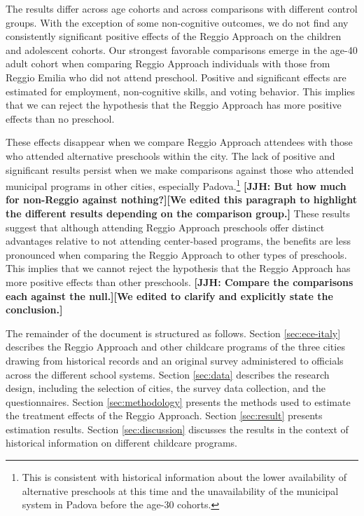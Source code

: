 The results differ across age cohorts and across comparisons with different control groups. With the exception of some non-cognitive outcomes, we do not find any consistently significant positive effects of the Reggio Approach on the children and adolescent cohorts. Our strongest favorable comparisons emerge in the age-40 adult cohort when comparing Reggio Approach individuals with those from Reggio Emilia who did not attend preschool. Positive and significant effects are estimated for employment, non-cognitive skills, and voting behavior. This implies that we can reject the hypothesis that the Reggio Approach has more positive effects than no preschool.

These effects disappear when we compare Reggio Approach attendees with those who attended alternative preschools within the city. The lack of positive and significant results persist when we make comparisons against those who attended municipal programs in other cities, especially Padova.\footnote{This is consistent with historical information about the lower availability of alternative preschools at this time and the unavailability of the municipal system in Padova before the age-30 cohorts.} \textbf{[JJH: But how much for non-Reggio against nothing?][We edited this paragraph to highlight the different results depending on the comparison group.]} These results suggest that although attending Reggio Approach preschools offer distinct advantages relative to not attending center-based programs, the benefits are less pronounced when comparing the Reggio Approach to other types of preschools. This implies that we cannot reject the hypothesis that the Reggio Approach has more positive effects than other preschools. \textbf{[JJH: Compare the comparisons each against the null.][We edited to clarify and explicitly state the conclusion.]}

The remainder of the document is structured as follows. Section \ref{sec:ece-italy} describes the Reggio Approach and other childcare programs of the three cities drawing from historical records and an original survey administered to officials across the different school systems. Section \ref{sec:data} describes the research design, including the selection of cities, the survey data collection, and the questionnaires. Section \ref{sec:methodology} presents the methods used to estimate the treatment effects of the Reggio Approach. Section \ref{sec:result} presents estimation results. Section \ref{sec:discussion} discusses the results in the context of historical information on different childcare programs.

